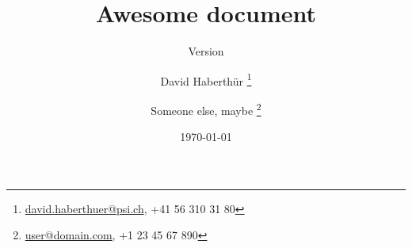 \documentclass[paper=a4,twoside=true,DIV=calc]{scrartcl}
\title{Awesome document}
\subtitle{Version \gitAbbrevHash}
\author{David Haberthür%
	\thanks{\href{mailto:david.haberthuer@psi.ch}{david.haberthuer@psi.ch}, +41 56 310 31 80}%
	\and%
	Someone else, maybe%
	\thanks{\href{mailto:user@domain.com}{user@domain.com}, +1 23 45 67 890}%
	}
\date{\today}
\begin{document}
\maketitle

\blinddocument

\printbibliography
\end{document}

